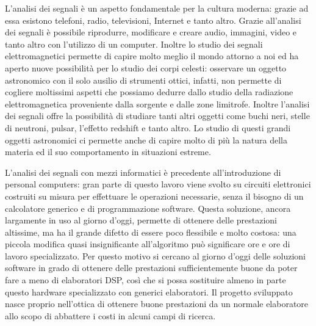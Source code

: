 L'analisi dei segnali \`e un aspetto fondamentale per la cultura moderna: grazie
ad essa esistono telefoni, radio, televisioni, Internet e tanto altro. Grazie
all'analisi dei segnali \`e possibile riprodurre, modificare e creare audio,
immagini, video e tanto altro con l'utilizzo di un computer. Inoltre lo studio
dei segnali elettromagnetici permette di capire molto meglio il mondo attorno a
noi ed ha aperto nuove possibilit\`a per lo studio dei corpi celesti: osservare
un oggetto astronomico con il solo ausilio di strumenti ottici, infatti, non
permette di cogliere moltissimi aspetti che possiamo dedurre dallo studio della
radiazione elettromagnetica proveniente dalla sorgente e dalle zone limitrofe.
Inoltre l'analisi dei segnali offre la possibilit\`a di studiare tanti altri
oggetti come buchi neri, stelle di neutroni, pulsar, l'effetto redshift e tanto
altro. Lo studio di questi grandi oggetti astronomici ci permette anche di
capire molto di pi\`u la natura della materia ed il suo comportamento in
situazioni estreme.

L'analisi dei segnali con mezzi informatici \`e precedente all'introduzione di
personal computers: gran parte di questo lavoro viene svolto su circuiti
elettronici costruiti su misura per effettuare le operazioni necessarie, senza
il bisogno di un calcolatore generico e di programmazione software. Questa
soluzione, ancora largamente in uso al giorno d'oggi, permette di ottenere delle
prestazioni altissime, ma ha il grande difetto di essere poco flessibile e molto
costosa: una piccola modifica quasi insignificante all'algoritmo pu\`o
significare ore e ore di lavoro specializzato. Per questo motivo si cercano al
giorno d'oggi delle soluzioni software in grado di ottenere delle prestazioni
sufficientemente buone da poter fare a meno di elaboratori DSP, cos\`i che si
possa sostituire almeno in parte questo hardware specializzato con generici
elaboratori. Il progetto sviluppato nasce proprio nell'ottica di ottenere buone
prestazioni da un normale elaboratore allo scopo di abbattere i costi in alcuni
campi di ricerca.
